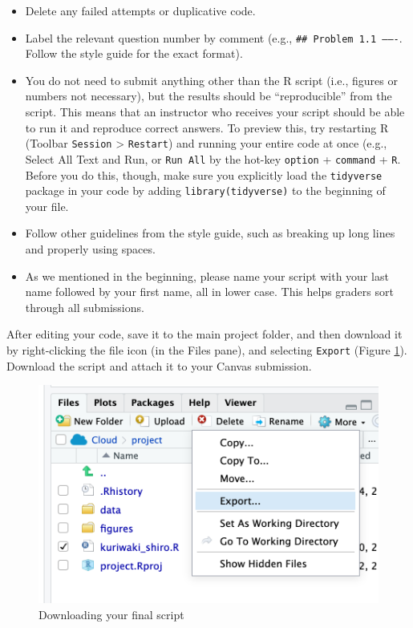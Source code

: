 \documentclass[11pt]{article}
\providecommand{\tightlist}{%
  \setlength{\itemsep}{0pt}\setlength{\parskip}{0pt}}
\newcommand{\code}[1]{\colorbox{light-gray}{\texttt{#1}}}
\begin{document}
\begin{itemize}
\tightlist
\item
  Delete any failed attempts or duplicative code.
\item
  Label the relevant question number by comment (e.g.,
  \code{\#\# Problem 1.1 -------}. Follow the style guide for the exact
  format).
\item
  You do not need to submit anything other than the R script (i.e.,
  figures or numbers not necessary), but the results should be
  ``reproducible'' from the script. This means that an instructor who
  receives your script should be able to run it and reproduce correct
  answers. To preview this, try restarting R (Toolbar \texttt{Session}
  \textgreater{} \texttt{Restart}) and running your entire code at once
  (e.g., Select All Text and Run, or \texttt{Run\ All} by the hot-key
  \texttt{option} + \texttt{command} + \texttt{R}. Before you do this,
  though, make sure you explicitly load the \texttt{tidyverse} package
  in your code by adding \code{library(tidyverse)} to the beginning of
  your file.
\item
  Follow other guidelines from the style guide, such as breaking up long
  lines and properly using spaces.
\item
  As we mentioned in the beginning, please name your script with your
  last name followed by your first name, all in lower case. This helps
  graders sort through all submissions.
\end{itemize}

After editing your code, save it to the main project folder, and then
download it by right-clicking the file icon (in the Files pane), and
selecting \texttt{Export} (Figure \ref{fig:export}). Download the script
and attach it to your Canvas submission.

\FloatBarrier

\begin{figure}[!h]
\centering
\includegraphics[width = 0.5\linewidth]{images/07_export.png}
\caption{Downloading your final script}
\label{fig:export}
\end{figure}
\end{document}
